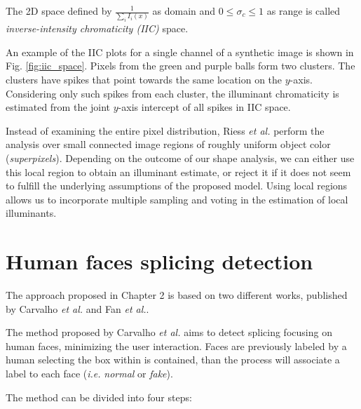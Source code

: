 The 2D space defined by $\frac{1}{\sum_{i} I_i(x)}$ as domain and $0 \leq \sigma_c \leq 1$ as range is called \emph{inverse-intensity chromaticity (IIC)} space.

An example of the IIC plots for a single channel of a synthetic image is shown in Fig. \ref{fig:iic_space}.
Pixels from the green and purple balls form two clusters. The clusters have spikes that point towards the same location on the $y$-axis. Considering only such spikes from each cluster, the illuminant chromaticity is estimated from the joint $y$-axis intercept of all spikes in IIC space.

Instead of examining the entire pixel distribution, Riess \emph{et al.}\cite{riess2010scene} perform the analysis over small connected image regions of roughly uniform object color (\emph{superpixels}). Depending on the outcome of our shape analysis, we can either use this local region to obtain an illuminant estimate, or reject it if it does not seem to fulfill the underlying assumptions of the proposed model. Using local regions allows us to incorporate multiple sampling and voting in the estimation of local illuminants.

\section{Human faces splicing detection}

The approach proposed in Chapter 2 is based on two different works, published by Carvalho \emph{et al.}\cite{carvalho2016illuminant} and Fan \emph{et al.}\cite{fan2015image}.

The method proposed by Carvalho \emph{et al.}\cite{carvalho2016illuminant} aims to detect splicing focusing on human faces, minimizing the user interaction. Faces are previously labeled by a human selecting the box within is contained, than the process will associate a label to each face (\emph{i.e.} \emph{normal} or \emph{fake}).

The method can be divided into four steps:

